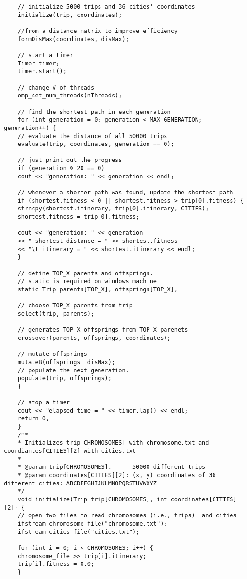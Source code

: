 \documentclass[11pt, letterpaper]{article}
\begin{document}
\begin{lstlisting}
	// initialize 5000 trips and 36 cities' coordinates
	initialize(trip, coordinates);
	
	//from a distance matrix to improve efficiency
	formDisMax(coordinates, disMax);
	
	// start a timer
	Timer timer;
	timer.start();
	
	// change # of threads
	omp_set_num_threads(nThreads);
	
	// find the shortest path in each generation
	for (int generation = 0; generation < MAX_GENERATION; generation++) {
	// evaluate the distance of all 50000 trips
	evaluate(trip, coordinates, generation == 0);
	
	// just print out the progress
	if (generation % 20 == 0)
	cout << "generation: " << generation << endl;
	
	// whenever a shorter path was found, update the shortest path
	if (shortest.fitness < 0 || shortest.fitness > trip[0].fitness) {
	strncpy(shortest.itinerary, trip[0].itinerary, CITIES);
	shortest.fitness = trip[0].fitness;
	
	cout << "generation: " << generation
	<< " shortest distance = " << shortest.fitness
	<< "\t itinerary = " << shortest.itinerary << endl;
	}
	
	// define TOP_X parents and offsprings.
	// static is required on windows machine
	static Trip parents[TOP_X], offsprings[TOP_X];
	
	// choose TOP_X parents from trip
	select(trip, parents);
	
	// generates TOP_X offsprings from TOP_X parenets
	crossover(parents, offsprings, coordinates);
	
	// mutate offsprings
	mutateB(offsprings, disMax);
	// populate the next generation.
	populate(trip, offsprings);
	}
	
	// stop a timer
	cout << "elapsed time = " << timer.lap() << endl;
	return 0;
	}
	/**
	* Initializes trip[CHROMOSOMES] with chromosome.txt and coordiantes[CITIES][2] with cities.txt
	*
	* @param trip[CHROMOSOMES]:      50000 different trips
	* @param coordinates[CITIES][2]: (x, y) coordinates of 36 different cities: ABCDEFGHIJKLMNOPQRSTUVWXYZ
	*/
	void initialize(Trip trip[CHROMOSOMES], int coordinates[CITIES][2]) {
	// open two files to read chromosomes (i.e., trips)  and cities
	ifstream chromosome_file("chromosome.txt");
	ifstream cities_file("cities.txt");
	
	for (int i = 0; i < CHROMOSOMES; i++) {
	chromosome_file >> trip[i].itinerary;
	trip[i].fitness = 0.0;
	}
	

\end{lstlisting}
\end{document}
